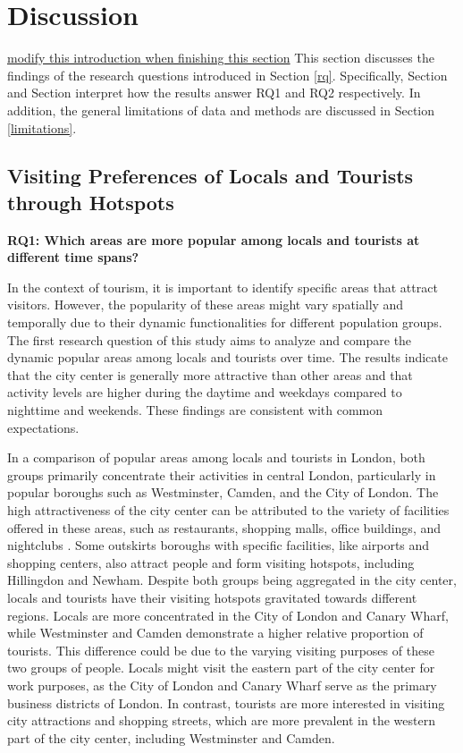 \documentclass{article}
\theoremstyle{remark}
\begin{document}
\section{Discussion}
\underline{modify this introduction when finishing this section}
This section discusses the findings of the research questions introduced in Section \ref{rq}. Specifically, Section \label{discussion_rq1} and Section \label{discussion_rq2} interpret how the results answer RQ1 and RQ2 respectively. In addition, the general limitations of data and methods are discussed in Section \ref{limitations}.

\subsection{Visiting Preferences of Locals and Tourists through Hotspots} \label{discussion_rq1}
\textbf{RQ1: Which areas are more popular among locals and tourists at different time spans?}

In the context of tourism, it is important to identify specific areas that attract visitors. However, the popularity of these areas might vary spatially and temporally due to their dynamic functionalities for different population groups. The first research question of this study aims to analyze and compare the dynamic popular areas among locals and tourists over time. The results indicate that the city center is generally more attractive than other areas and that activity levels are higher during the daytime and weekdays compared to nighttime and weekends. These findings are consistent with common expectations.

In a comparison of popular areas among locals and tourists in London, both groups primarily concentrate their activities in central London, particularly in popular boroughs such as Westminster, Camden, and the City of London. The high attractiveness of the city center can be attributed to the variety of facilities offered in these areas, such as restaurants, shopping malls, office buildings, and nightclubs \citep{lau_understanding_2006}. Some outskirts boroughs with specific facilities, like airports and shopping centers, also attract people and form visiting hotspots, including Hillingdon and Newham. Despite both groups being aggregated in the city center, locals and tourists have their visiting hotspots gravitated towards different regions. Locals are more concentrated in the City of London and Canary Wharf, while Westminster and Camden demonstrate a higher relative proportion of tourists. This difference could be due to the varying visiting purposes of these two groups of people. Locals might visit the eastern part of the city center for work purposes, as the City of London and Canary Wharf serve as the primary business districts of London. In contrast, tourists are more interested in visiting city attractions and shopping streets, which are more prevalent in the western part of the city center, including Westminster and Camden.
\end{document}
